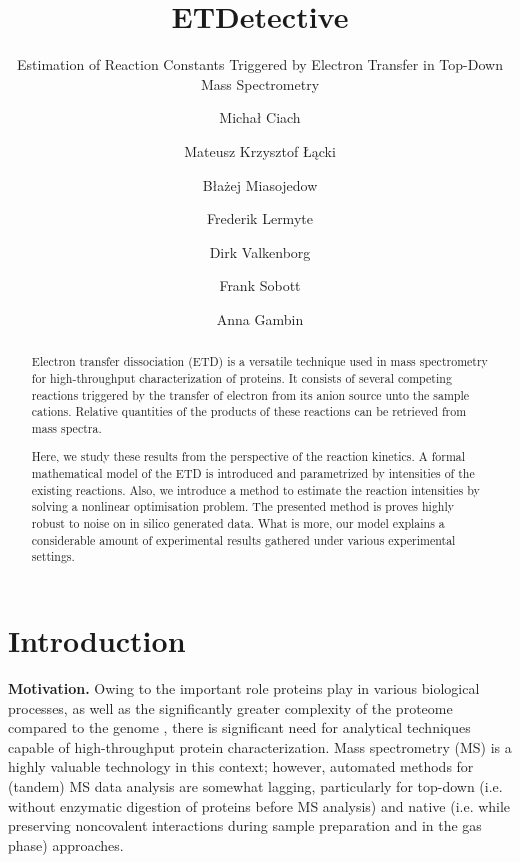 \documentclass{llncs}
\begin{document}
\pagestyle{plain}
\title{ETDetective}
\subtitle{Estimation of Reaction Constants Triggered by Electron Transfer in Top-Down Mass Spectrometry}
\author{Michał Ciach \and Mateusz Krzysztof Łącki \and Błażej Miasojedow \and Frederik Lermyte \and Dirk Valkenborg \and Frank Sobott \and Anna Gambin }


\maketitle
\begin{abstract}
        Electron transfer dissociation (ETD) is a versatile technique used in mass spectrometry for high-throughput characterization of proteins. It consists of several competing reactions triggered by the transfer of electron from its anion source unto the sample cations. Relative quantities of the products of these reactions can be retrieved from mass spectra.

        Here, we study these results from the perspective of the reaction kinetics. A formal mathematical model of the ETD is introduced and parametrized by intensities of the existing reactions. Also, we introduce a method to estimate the reaction intensities by solving a nonlinear optimisation problem. The presented method is proves highly robust to noise on in silico generated data. What is more, our model explains a considerable amount of experimental results gathered under various experimental settings.
\end{abstract}

\section{Introduction}
\textbf{Motivation.}
        Owing to the important role proteins play in various biological processes, as well as the significantly greater complexity of the proteome compared to the genome \cite{Smith2013}, there is significant need for analytical techniques capable of high-throughput protein characterization. Mass spectrometry (MS) is a highly valuable technology in this context; however, automated methods for (tandem) MS data analysis are somewhat lagging, particularly for top-down (i.e. without enzymatic digestion of proteins before MS analysis) and native (i.e. while preserving noncovalent interactions during sample preparation and in the gas phase) approaches.
\end{document}

